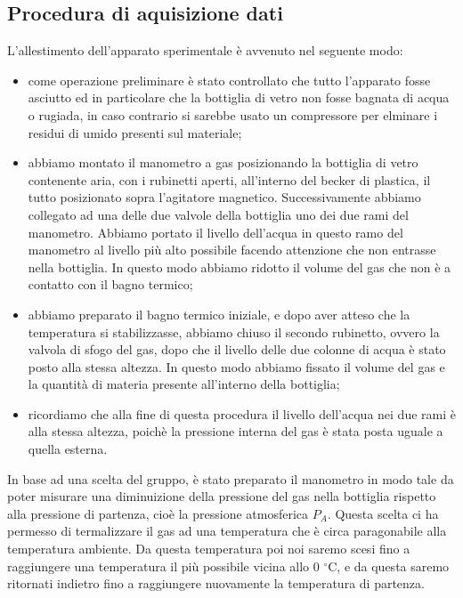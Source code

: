 \subsection{Procedura di aquisizione dati}
L'allestimento dell'apparato sperimentale è avvenuto nel seguente modo:

\begin{itemize}
	\item{come operazione preliminare è stato controllato che tutto l'apparato fosse asciutto ed in particolare che la bottiglia di vetro non fosse bagnata di acqua o rugiada, in caso contrario si sarebbe usato un compressore per elminare i residui di umido presenti sul materiale;}
	\item{abbiamo montato il manometro a gas posizionando la bottiglia di vetro contenente aria, con i rubinetti aperti, all'interno del becker di plastica, il tutto posizionato sopra l'agitatore magnetico. Successivamente abbiamo collegato ad una delle due valvole della bottiglia uno dei due rami del manometro. Abbiamo portato il livello dell'acqua in questo ramo del manometro al livello più alto possibile facendo attenzione che non entrasse nella bottiglia. In questo modo abbiamo ridotto il volume del gas che non è a contatto con il bagno termico;}
	\item{abbiamo preparato il bagno termico iniziale, e dopo aver atteso che la temperatura si stabilizzasse, abbiamo chiuso il secondo rubinetto, ovvero la valvola di sfogo del gas, dopo che il livello delle due colonne di acqua è stato posto alla stessa altezza. In questo modo abbiamo fissato il volume del gas e la quantità di materia presente all'interno della bottiglia;}
	\item{ricordiamo che alla fine di questa procedura il livello dell'acqua nei due rami è alla stessa altezza, poichè la pressione interna del gas è stata posta uguale a quella esterna.}
\end{itemize}
%

In base ad una scelta del gruppo, è stato preparato il manometro in modo tale da poter misurare una diminuizione della pressione del gas nella bottiglia rispetto alla pressione di partenza, cioè la pressione atmosferica $P_A$. Questa scelta ci ha permesso di termalizzare il gas ad una temperatura che è circa paragonabile alla temperatura ambiente. Da questa temperatura poi noi saremo scesi fino a raggiungere una temperatura il più possibile vicina allo 0 $^\circ$C, e da questa saremo ritornati indietro fino a raggiungere nuovamente la temperatura di partenza.

